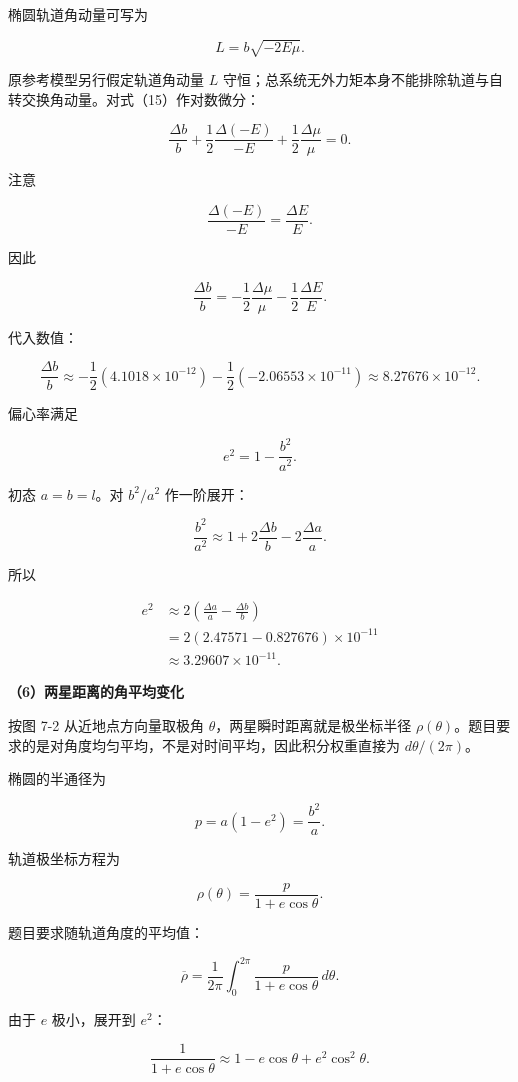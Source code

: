 \documentclass[12pt,a4paper,UTF8]{ctexart}
\begin{document}
椭圆轨道角动量可写为

\[
L=b\sqrt{-2E\mu}.
\tag{15}
\]

原参考模型另行假定轨道角动量 \(L\)
守恒；总系统无外力矩本身不能排除轨道与自转交换角动量。对式（15）作对数微分：

\[
\frac{\Delta b}{b}
+\frac12\frac{\Delta(-E)}{-E}
+\frac12\frac{\Delta\mu}{\mu}=0.
\]

注意

\[
\frac{\Delta(-E)}{-E}=\frac{\Delta E}{E}.
\]

因此

\[
\boxed{
\frac{\Delta b}{b}
=-\frac12\frac{\Delta\mu}{\mu}
-\frac12\frac{\Delta E}{E}
}.
\tag{16}
\]

代入数值：

\[
\frac{\Delta b}{b}
\approx-\frac12(4.1018\times10^{-12})
-\frac12(-2.06553\times10^{-11})
\approx8.27676\times10^{-12}.
\tag{17}
\]

偏心率满足

\[
e^2=1-\frac{b^2}{a^2}.
\]

初态 \(a=b=l\)。对 \(b^2/a^2\) 作一阶展开：

\[
\frac{b^2}{a^2}
\approx1+2\frac{\Delta b}{b}-2\frac{\Delta a}{a}.
\]

所以

\[
\begin{aligned}
e^2
&\approx2\left(\frac{\Delta a}{a}-\frac{\Delta b}{b}\right)\\
&=2(2.47571-0.827676)\times10^{-11}\\
&\approx3.29607\times10^{-11}.
\end{aligned}
\tag{18}
\]

\textbf{（6）两星距离的角平均变化}

按图 7-2 从近地点方向量取极角 \(\theta\)，两星瞬时距离就是极坐标半径
\(\rho(\theta)\)。题目要求的是对角度均匀平均，不是对时间平均，因此积分权重直接为
\(d\theta/(2\pi)\)。

椭圆的半通径为

\[
p=a(1-e^2)=\frac{b^2}{a}.
\]

轨道极坐标方程为

\[
\rho(\theta)=\frac{p}{1+e\cos\theta}.
\tag{19}
\]

题目要求随轨道角度的平均值：

\[
\overline\rho
=\frac1{2\pi}\int_0^{2\pi}\frac{p}{1+e\cos\theta}\,d\theta.
\]

由于 \(e\) 极小，展开到 \(e^2\)：

\[
\frac1{1+e\cos\theta}
\approx1-e\cos\theta+e^2\cos^2\theta.
\]
\end{document}
